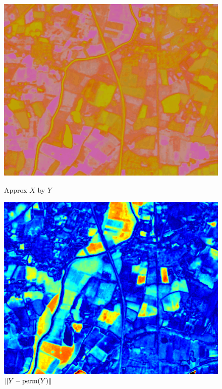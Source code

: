\documentclass{beamer}
\begin{document}
\begin{frame}
\begin{figure}[ht]
    \hfill
    \begin{minipage}[b]{0.28\linewidth}
      \centering
      \includegraphics[width=\textwidth]{./Images/ChangeDetect/Flood/permY.png}
      \caption{Approx $X$ by $Y$}
    \end{minipage}
    \hfill
    \begin{minipage}[b]{0.28\linewidth}
      \centering
      \includegraphics[width=\textwidth]{./Images/ChangeDetect/Flood/ChangesYtoX.png}
      \caption{$\left\lVert Y-\text{perm}(Y)\right\rVert$}
    \end{minipage}
  \end{figure}  
\end{frame}
\end{document}
